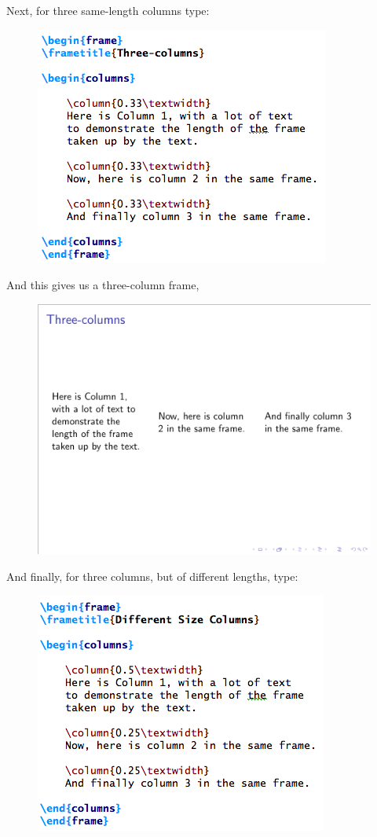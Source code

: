 \documentclass[11pt]{article}
\begin{document}
Next, for three same-length columns type:

\begin{figure}[!h]
	\includegraphics[scale=.6]{CODE7}
	\centering
\end{figure}

And this gives us a three-column frame, 

\begin{figure}[!h]
	\includegraphics[scale=.5]{OUT7}
	\centering
\end{figure}

\newpage

And finally, for three columns, but of different lengths, type:

\begin{figure}[!h]
	\includegraphics[scale=.6]{CODE8}
	\centering
\end{figure}
\end{document}
